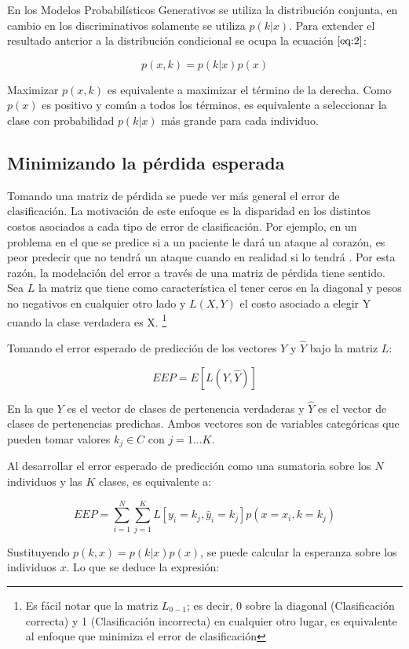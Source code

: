 En los Modelos Probabilísticos Generativos se utiliza la distribución conjunta, en cambio en los discriminativos solamente se utiliza $p(k|x)$. Para extender el resultado anterior a la distribución condicional se ocupa la ecuación $\ref{eq:2}$:

$$p(x,k)  = p(k|x)p(x)$$

Maximizar $p(x,k)$ es equivalente a maximizar el término de la derecha. Como $p(x)$ es positivo y común a todos los términos, es equivalente a seleccionar la clase con probabilidad $p(k|x)$ más grande para cada individuo. 

\subsection{Minimizando la pérdida esperada}

Tomando una matriz de pérdida se puede ver más general el error de clasificación. La motivación de este enfoque es la disparidad en los distintos costos asociados a cada tipo de error de clasificación. Por ejemplo, en un problema en el que se predice si a un paciente le dará un ataque al corazón, es peor predecir que no tendrá un ataque cuando en realidad si lo tendrá \cite{hastie2009elements}. Por esta razón, la modelación del error a través de una matriz de pérdida tiene sentido. Sea $L$ la matriz que tiene como característica el tener ceros en la diagonal y pesos no negativos en cualquier otro lado y $L(X,Y)$ el costo asociado a elegir Y cuando la clase verdadera es X. \footnote{Es fácil notar que la matriz $L_{0-1}$; es decir, 0 sobre la diagonal (Clasificación correcta) y 1 (Clasificación incorrecta) en cualquier otro lugar, es equivalente al enfoque que minimiza el error de clasificación}

Tomando el error esperado de predicción de los vectores $Y$ y $\widehat{Y}$ bajo la matriz $L$:

$$ EEP = E[L(Y, \widehat{Y})] $$

En la que $Y$ es el vector de clases de pertenencia verdaderas y $\widehat{Y}$ es el vector de clases de pertenencias predichas. Ambos vectores son de variables categóricas que pueden tomar valores $k_j \in C$ con $j = 1 ... K$. 

Al desarrollar el error esperado de predicción como una sumatoria sobre los $N$ individuos y las $K$ clases, es equivalente a:

$$EEP = \sum_{i = 1}^{N} \sum_{j=1}^{K} L[y_i = k_j, \widehat{y}_i = k_j] p(x = x_i, k = k_j)$$

Sustituyendo $p(k, x) = p(k | x)p(x)$, se puede calcular la esperanza sobre los individuos $x$. Lo que se deduce la expresión:

